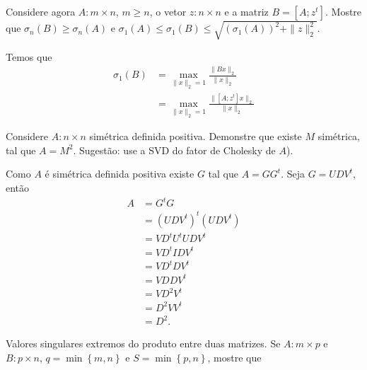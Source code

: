 \documentclass[a4paper,12pt, leqno, answers]{exam}
\begin{document}
\begin{questions}
    \question Considere agora $A : m \times n$, $m \geq n$, o vetor $z : n \times n$ e a matriz $B = [A; z^t]$. Mostre que $\sigma_n(B) \geq \sigma_n(A)$ e $\sigma_1(A) \leq \sigma_1(B) \leq \sqrt{\left( \sigma_1(A) \right)^2 + \| z \|_2^2}$.
    \begin{solution}
        Temos que
        \begin{align*}
            \sigma_1(B) &= \max_{\| x \|_2 = 1} \frac{\| B x \|_2}{\| x \|_2} \\
            &= \max_{\| x \|_2 = 1} \frac{\| [A; z^t] x \|_2}{\| x \|_2}
        \end{align*}
    \end{solution}

     Considere $A : n \times n$ sim\'{e}trica definida positiva. Demonstre que existe $M$ sim\'{e}trica, tal que $A = M^2$. Sugest\~{a}o: use a SVD do fator de Cholesky de $A$).
    \begin{solution}
        Como $A$ \'{e} sim\'{e}trica definida positiva existe $G$ tal que $A = G G^t$. Seja $G = U D V^t$, ent\~{a}o
        \begin{align*}
            A &= G^t G \\
            &= \left( U D V^t \right)^t \left( U D V^t \right) \\
            &= V D^t U^t U D V^t \\
            &= V D^t I D V^t \\
            &= V D^t D V^t \\
            &= V D D V^t \\
            &= V D^2 V^t \\
            &= D^2 V V^t \\
            &= D^2.
        \end{align*}
    \end{solution}

    \question Valores singulares extremos do produto entre duas matrizes. Se $A : m \times p$ e $B : p \times n$, $q = \min\left\{ m, n \right\}$ e $S = \min\left\{ p, n \right\}$, mostre que
\end{questions}
\end{document}
